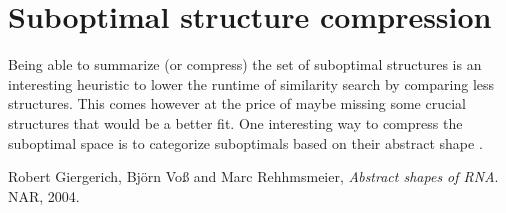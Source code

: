 \documentclass[a4paper, 12pt] {article}
\begin{document}
\section*{Suboptimal structure compression}
Being able to summarize (or compress) the set of suboptimal structures is an interesting heuristic to lower the
runtime of similarity search by comparing less structures. This comes however at the price of maybe missing 
some crucial structures that would be a better fit.
One interesting way to compress the suboptimal space is to categorize suboptimals based on their abstract shape \cite{abstractShapes2004}.


\todo[inline]

\begin{thebibliography}{42}

  Robert Giergerich, Bj{\"o}rn Vo{\ss} and Marc Rehhmsmeier,
  \emph{Abstract shapes of RNA}.
  NAR,
  2004.

\end{thebibliography}
\end{document}
